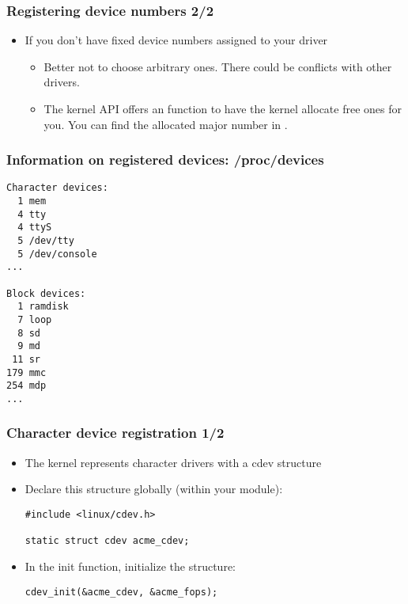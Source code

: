 \begin{frame}
  \frametitle{Registering device numbers 2/2}
  \begin{itemize}
  \item If you don't have fixed device numbers assigned to your driver
    \begin{itemize}
    \item Better not to choose arbitrary ones. There could be
      conflicts with other drivers.
    \item The kernel API offers an  function
      to have the kernel allocate free ones for you. You can find the
      allocated major number in .
    \end{itemize}
  \end{itemize}
\end{frame}

\begin{frame}[fragile]
  \frametitle{Information on registered devices: /proc/devices}
\begin{verbatim}
Character devices:
  1 mem
  4 tty
  4 ttyS
  5 /dev/tty
  5 /dev/console
...

Block devices:
  1 ramdisk
  7 loop
  8 sd
  9 md
 11 sr
179 mmc
254 mdp
...
\end{verbatim}
\end{frame}

\begin{frame}[fragile]
  \frametitle{Character device registration 1/2}
  \begin{itemize}
  \item The kernel represents character drivers with a cdev structure
  \item Declare this structure globally (within your module):
\begin{verbatim}
#include <linux/cdev.h>

static struct cdev acme_cdev;
\end{verbatim}
  \item In the init function, initialize the structure:
\begin{verbatim}
cdev_init(&acme_cdev, &acme_fops);
\end{verbatim}
\end{itemize}
\end{frame}

